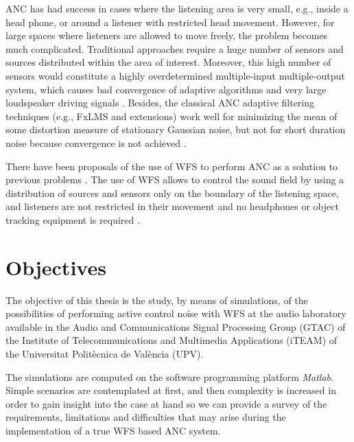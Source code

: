 ANC has had success in cases where the listening area is very small, e.g., inside a head phone, or around a listener with restricted head movement. However, for large spaces where listeners are allowed to move freely, the problem becomes much complicated. Traditional approaches require a huge number of sensors and sources distributed within the area of interest. Moreover, this high number of sensors would constitute a highly overdetermined multiple-input multiple-output system, which causes bad convergence of adaptive algorithms and very large loudspeaker driving signals \cite{Kuntz2004}. Besides, the classical ANC adaptive filtering techniques (e.g., FxLMS and extensions) work well for minimizing the mean of some distortion measure of stationary Gaussian noise, but not for short duration noise because convergence is not achieved \cite{Lapini2016}.

There have been proposals of the use of WFS to perform ANC as a solution to previous problems \cite{Lapini2016,Kuntz2004,Zanolin1999,Morcillo2015}. The use of WFS allows to control the sound field by using a distribution of sources and sensors only on the boundary of the listening space, and listeners are not restricted in their movement and no headphones or object tracking equipment is required \cite{Kuntz2004}.

\section{Objectives}

The objective of this thesis is the study, by means of simulations, of the possibilities of performing active control noise with WFS at the audio laboratory available in the Audio and Communications Signal Processing Group (GTAC) of the Institute of Telecommunications and Multimedia Applications (iTEAM) of the Universitat Politècnica de València (UPV).

The simulations are computed on the software programming platform \emph{Matlab}. Simple scenarios are contemplated at first, and then complexity is increased in order to gain insight into the case at hand so we can provide a survey of the requirements, limitations and difficulties that may arise during the implementation of a true WFS based ANC system.
